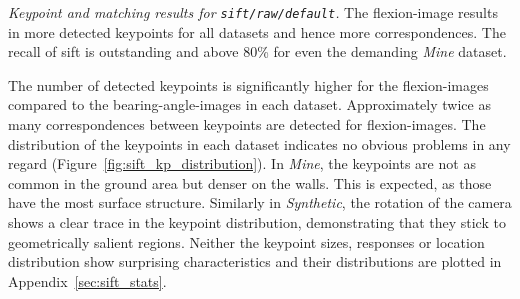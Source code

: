 \begin{table}[ht]
    {\renewcommand{\arraystretch}{1.2}%
    \setlength{\tabcolsep}{0.3em}%
    \footnotesize

    }
    \caption[Keypoint and matching results for \texttt{\acrshort{sift}/raw/default}]{\emph{Keypoint and matching results for \texttt{\acrshort{sift}/raw/default}.} The \gls{flexion-image} results in more detected keypoints for all datasets and hence more correspondences. The recall of \acrshort{sift} is outstanding and above 80\% for even the demanding \emph{Mine} dataset.}
\end{table}
The number of detected keypoints is significantly higher for the \glspl{flexion-image} compared to the \glspl{bearing-angle-image} in each dataset.
Approximately twice as many correspondences between keypoints are detected for \glspl{flexion-image}.
The distribution of the keypoints in each dataset indicates no obvious problems in any regard (Figure~\ref{fig:sift_kp_distribution}).
In \emph{Mine}, the keypoints are not as common in the ground area but denser on the walls.
This is expected, as those have the most surface structure.
Similarly in \emph{Synthetic}, the rotation of the camera shows a clear trace in the keypoint distribution, demonstrating that they stick to geometrically salient regions.
Neither the keypoint sizes, responses or location distribution show surprising characteristics and their distributions are plotted in Appendix~\ref{sec:sift_stats}.

